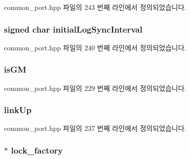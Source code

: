 common\+\_\+port.\+hpp 파일의 243 번째 라인에서 정의되었습니다.

\subsubsection[{\texorpdfstring{initial\+Log\+Sync\+Interval}{initialLogSyncInterval}}]{\setlength{\rightskip}{0pt plus 5cm}signed char initial\+Log\+Sync\+Interval}\hypertarget{struct_port_init__t_af64dc42272c346cc5f6f400c0e7d7088}{}\label{struct_port_init__t_af64dc42272c346cc5f6f400c0e7d7088}


common\+\_\+port.\+hpp 파일의 240 번째 라인에서 정의되었습니다.

\subsubsection[{\texorpdfstring{is\+GM}{isGM}}]{ is\+GM}\hypertarget{struct_port_init__t_ac1d89714b4aa7aa5414b44238e26d5a2}{}\label{struct_port_init__t_ac1d89714b4aa7aa5414b44238e26d5a2}


common\+\_\+port.\+hpp 파일의 229 번째 라인에서 정의되었습니다.

\subsubsection[{\texorpdfstring{link\+Up}{linkUp}}]{ link\+Up}\hypertarget{struct_port_init__t_a3e5a0a3ec08db1c42b0f090083c8818d}{}\label{struct_port_init__t_a3e5a0a3ec08db1c42b0f090083c8818d}


common\+\_\+port.\+hpp 파일의 237 번째 라인에서 정의되었습니다.

\subsubsection[{\texorpdfstring{lock\+\_\+factory}{lock_factory}}]{$\ast$ lock\+\_\+factory}\hypertarget{struct_port_init__t_a58729cd56552f6d66559abd63d013426}{}\label{struct_port_init__t_a58729cd56552f6d66559abd63d013426}


